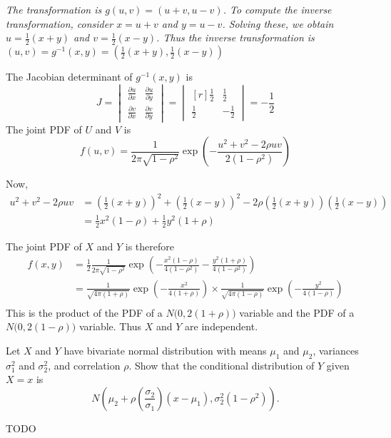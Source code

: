 \begin{exercise}
\begin{questions}
\begin{answer}
\bit
\it The transformation is $g(u,v) = (u+v,u-v)$. 
\it To compute the inverse transformation, consider $x=u+v$ and $y=u-v$. 
\it Solving these, we obtain $u = \frac{1}{2}(x+y)$ and $v = \frac{1}{2}(x-y)$.
\it Thus the inverse transformation is $(u,v) = g^{-1}(x,y) = \left(\frac{1}{2}(x+y),\frac{1}{2}(x-y)\right)$
\eit

The Jacobian determinant of $g^{-1}(x,y)$ is
\[
J = 
\begin{vmatrix}
\frac{\partial u}{\partial x}  & \frac{\partial u}{\partial y}  \\
\frac{\partial v}{\partial x}  & \frac{\partial v}{\partial y} 
\end{vmatrix}
=
\begin{vmatrix}[r]
\frac{1}{2}   &  \frac{1}{2} \\
\frac{1}{2}  & -\frac{1}{2}
\end{vmatrix}
=
-\frac{1}{2}
\]
The joint PDF of $U$ and $V$ is 
\[
f(u,v) = \frac{1}{2\pi \sqrt{1-\rho ^{2}}} \exp\left( -\frac{u^2 + v^2 - 2\rho uv}{2(1-\rho^2)} \right)
\]

Now,
\begin{align*}
u^2 + v^2 - 2\rho uv
	& = \left(\frac{1}{2}(x+y)\right)^2 +\left(\frac{1}{2}(x-y)\right)^2 - 2\rho\left(\frac{1}{2}(x+y)\right)\left(\frac{1}{2}(x-y)\right) \\
	& = \frac{1}{2}x^2(1-\rho ) + \frac{1}{2}y^2(1+\rho )
\end{align*}	

The joint PDF of $X$ and $Y$ is therefore
\begin{align*}
f(x,y) 
	& = \frac{1}{2} \frac{1}{2\pi\sqrt{1-\rho ^{2}}}\exp\left( -\frac{x^{2} (1-\rho )}{4(1-\rho ^{2} )} -\frac{y^{2} (1+\rho )}{4(1-\rho ^{2})}\right) \\
	& = \frac{1}{\sqrt{4\pi(1+\rho)}}\exp\left(-\frac{x^{2}}{4(1+\rho)}\right) \times \frac{1}{\sqrt{4\pi(1-\rho)}}\exp\left(-\frac{y^{2}}{4(1-\rho )}\right) \\
\end{align*}
This is the product of the PDF of a $N\big(0,2(1+\rho)\big)$ variable and the PDF of a $N\big(0,2(1-\rho)\big)$ variable. Thus $X$ and $Y$ are independent. 
\end{answer}

\question
Let $X$ and $Y$ have bivariate normal distribution with means $\mu_1$ and $\mu_2$, variances $\sigma_1^2$ and $\sigma_2^2$, and correlation $\rho$. Show that the conditional distribution of $Y$ given $X=x$ is
\[
N\left(\mu_2 + \rho\left(\frac{\sigma_2}{\sigma_1}\right)(x-\mu_1), \sigma_2^2(1-\rho^2)\right).
\]
\begin{answer}
TODO
\end{answer}
\question
\begin{parts}

\end{parts}
\end{questions}
\end{exercise}
